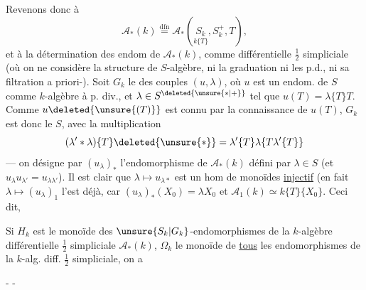 Revenons donc à
\[
\mathcal A_*(k)\overset{\mathrm{dfn}}=\mathcal A_*(\underset{k\{T\}}{S_k},S_k^+,T),
\]
et à la détermination des endom de $\mathcal A_*(k)$, comme   différentielle $\frac12$ simpliciale (où on ne considère  la structure de $S$-algèbre, ni la graduation ni les p.d., ni sa filtration a priori-). 
Soit $G_k$ le   des couples $(u,\lambda)$, où $u$ est un endom. de $S$ comme $k$-algèbre à p. div., et $\lambda\in S^{\deleted{\unsure{*|+}}}$ tel que $u(T)=\lambda\{T\}T$. Comme $u\deleted{\unsure{(T)}}$ est connu par la connaissance de $u(T)$, $G_k$ est donc le    $S$, avec la multiplication
\[
(\lambda'*\lambda)\{T\}\deleted{\unsure{*}}=\lambda'\{T\}\lambda\{T\lambda'\{T\}\}
\]
 --- on désigne par $(u_\lambda)_*$ l'endomorphisme de $\mathcal A_*(k)$ défini par $\lambda\in S$ (et $u_\lambda u_{\lambda'}=u_{\lambda\lambda'}$).
Il est clair que $\lambda\longmapsto u_{\lambda*}$ est un hom de monoïdes \uline{injectif} (en fait $\lambda\longmapsto(u_\lambda)_1$ l'est déjà, car $(u_\lambda)_*(X_0)=\lambda X_0$ et $\mathcal A_1(k)\simeq k\{T\}\{X_0\}$.
Ceci dit,

Si $H_k$ est le monoïde des $\unsure{S_k|G_k}$-endomorphismes de la $k$-algèbre différentielle $\frac12$ simpliciale $\mathcal A_*(k)$,   $\Omega_k$ le monoïde de \uline{tous} les endomorphismes de la $k$-alg. diff. $\frac12$ simpliciale, on a

\begin{center}-  -\end{center}

